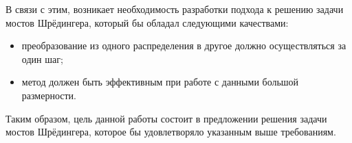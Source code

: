 В связи с этим, возникает необходимость разработки подхода к решению задачи мостов Шрёдингера, который бы обладал следующими качествами:
\begin{itemize}
\item преобразование из одного распределения в другое должно осуществляться за один шаг;
\item метод должен быть эффективным при работе с данными большой размерности.
\end{itemize}

Таким образом, цель данной работы состоит в предложении решения задачи мостов Шрёдингера, которое бы удовлетворяло указанным выше требованиям. 

\newpage